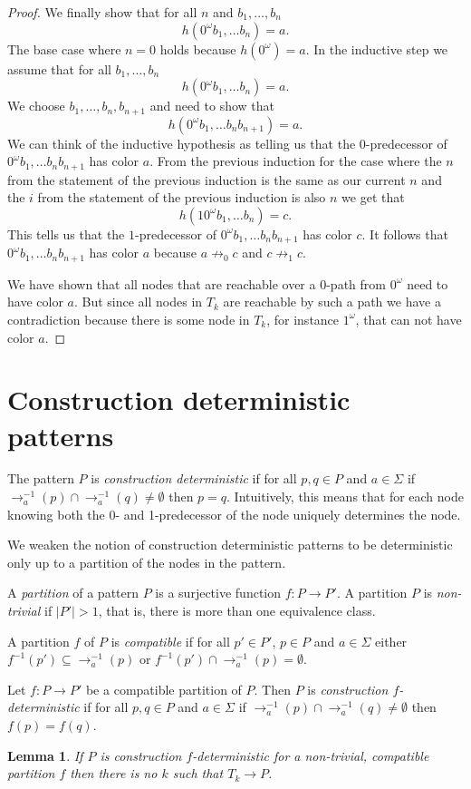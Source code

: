 \documentclass[a4paper]{article}
\newtheorem{lemma}[theorem]{Lemma}
\begin{document}
\begin{proof}
\medskip

We finally show that for all $n$ and $b_1,\dots,b_n$
\[
 h(0^\omega b_1,\dots b_n) = a.
\]
The base case where $n = 0$ holds because $h(0^\omega) = a$.
In the inductive step we assume that for all $b_1,\dots,b_n$
\[
 h(0^\omega b_1,\dots b_n) = a.
\]
We choose $b_1,\dots,b_n,b_{n + 1}$ and need to show that
\[
 h(0^\omega b_1,\dots b_n b_{n + 1}) = a.
\]
We can think of the inductive hypothesis as telling us that the
$0$-predecessor of $0^\omega b_1,\dots b_n b_{n + 1}$ has color $a$.
From the previous induction for the case where the $n$ from the
statement of the previous induction is the same as our current $n$ and
the $i$ from the statement of the previous induction is also $n$ we get
that
\[
 h(1 0^\omega b_1,\dots b_n) = c.
\]
This tells us that the $1$-predecessor of $0^\omega b_1,\dots b_n b_{n +
1}$ has color $c$. It follows that $0^\omega b_1,\dots b_n b_{n +
1}$ has color $a$ because $a \not \rightarrow_0 c$ and $c \not
\rightarrow_1 c$.

\medskip

We have shown that all nodes that are reachable over a $0$-path from
$0^\omega$ need to have color $a$. But since all nodes in $T_k$ are
reachable by such a path we have a contradiction because there is some
node in $T_k$, for instance $1^\omega$, that can not have color $a$.
\end{proof}


\section{Construction deterministic patterns}

\newcommand{\prearrow}[1]{{\rightarrow_{#1}^{-1}}}

The pattern $P$ is \emph{construction deterministic} if for all $p,q \in
P$ and $a \in \Sigma$ if $\prearrow{a}(p) \cap \prearrow{a}(q) \neq
\emptyset$ then $p = q$. Intuitively, this means that for each node
knowing both the 0- and 1-predecessor of the node uniquely determines
the node.

We weaken the notion of construction deterministic patterns to be
deterministic only up to a partition of the nodes in the pattern.

A \emph{partition} of a pattern $P$ is a surjective function $f : P \to
P'$. A partition $P$ is \emph{non-trivial} if $|P'| > 1$, that is, there
is more than one equivalence class.

A partition $f$ of $P$ is \emph{compatible} if for all $p' \in P'$, $p
\in P$ and $a \in \Sigma$ either $f^{-1}(p') \subseteq \prearrow{a}(p)$
or $f^{-1}(p') \cap \prearrow{a}(p) = \emptyset$.

Let $f : P \to P'$ be a compatible partition of $P$. Then $P$ is
\emph{construction $f$-deterministic} if for all $p,q \in P$ and $a \in
\Sigma$ if $\prearrow{a}(p) \cap \prearrow{a}(q) \neq \emptyset$ then
$f(p) = f(q)$.

\begin{lemma} \label{killer lemma}
 If $P$ is construction $f$-deterministic for a non-trivial, compatible
partition $f$ then there is no $k$ such that $T_k \to P$.
\end{lemma}
\end{document}
